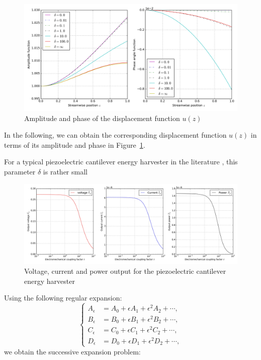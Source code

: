 \documentclass{article}
\begin{document}
\begin{figure}[!htbp]
    \centering
    \includegraphics[width=\textwidth]{./img_eig_asy/fig_sol_analytic_disp_fun.jpg}
    \caption{Amplitude and phase of the displacement function $u(z)$}
    \label{fig:fig_sol_analytic_disp_fun}
\end{figure}

In the following, we can obtain the corresponding displacement function $u(z)$ in terms of its amplitude and phase in Figure~\ref{fig:fig_sol_analytic_disp_fun}. 


For a typical piezoelectric cantilever energy harvester in the literature \cite{erturk2008distributed,erturk2009experimentally}, this parameter $\delta$ is rather small

\begin{figure}[!htbp]
    \centering
    \includegraphics[width=\textwidth]{./img_eig_asy/fig_sol_analytic_perf_fun.jpg}
    \caption{Voltage, current and power output for the piezoelectric cantilever energy harvester}
    \label{fig:fig_sol_analytic_perf_fun}
\end{figure}


Using the following regular expansion:
\begin{equation}
    \left\{\begin{aligned}
        A_\epsilon &= A_0 + \epsilon A_1 + \epsilon^2 A_2 + \cdots, \\
        B_\epsilon &= B_0 + \epsilon B_1 + \epsilon^2 B_2 + \cdots, \\
        C_\epsilon &= C_0 + \epsilon C_1 + \epsilon^2 C_2 + \cdots, \\
        D_\epsilon &= D_0 + \epsilon D_1 + \epsilon^2 D_2 + \cdots, 
    \end{aligned}\right.
\end{equation}
we obtain the successive expansion problem:
\end{document}
